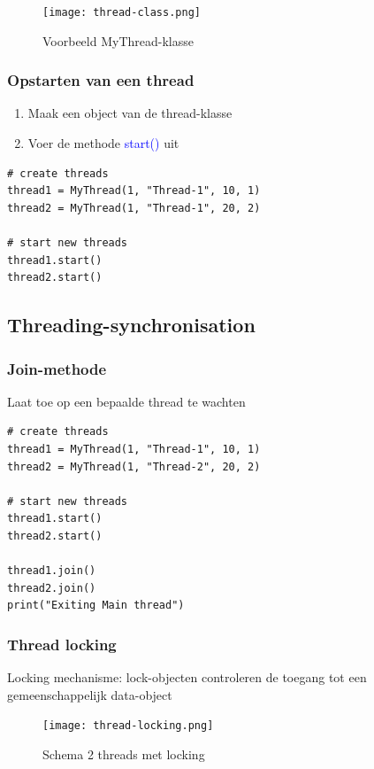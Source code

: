 \documentclass{article}
\begin{document}
\begin{figure}[H]
    \centering
    \texttt{[image: thread-class.png]}
    \caption{Voorbeeld MyThread-klasse}
\end{figure}

\subsubsection{Opstarten van een thread}

\begin{enumerate}
    \item Maak een object van de thread-klasse
    \item Voer de methode \textcolor{blue}{start()} uit 
\end{enumerate}

\begin{verbatim}
# create threads
thread1 = MyThread(1, "Thread-1", 10, 1)
thread2 = MyThread(1, "Thread-1", 20, 2)

# start new threads
thread1.start()
thread2.start()
\end{verbatim}

\subsection{Threading-synchronisation}

\subsubsection{Join-methode}

Laat toe op een bepaalde thread te wachten

\begin{verbatim}
# create threads
thread1 = MyThread(1, "Thread-1", 10, 1)
thread2 = MyThread(1, "Thread-2", 20, 2)

# start new threads
thread1.start()
thread2.start()

thread1.join()
thread2.join()
print("Exiting Main thread")
\end{verbatim}

\subsubsection{Thread locking}

Locking mechanisme: lock-objecten controleren de toegang tot een gemeenschappelijk data-object

\begin{figure}[H]
    \centering
    \texttt{[image: thread-locking.png]}
    \caption{Schema 2 threads met locking}
\end{figure}
\end{document}
